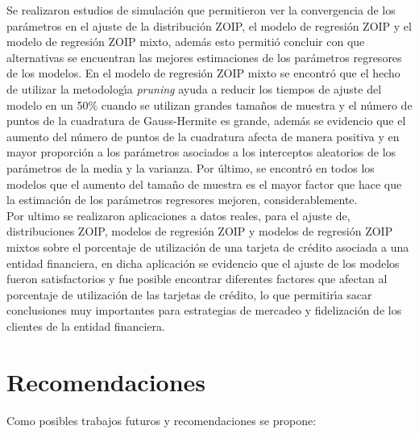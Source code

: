 Se realizaron estudios de simulaci\'{o}n que permitieron ver la convergencia de los par\'{a}metros en el ajuste de la distribuci\'{o}n ZOIP, el modelo de regresi\'{o}n ZOIP y el modelo de regresi\'{o}n ZOIP mixto, adem\'{a}s esto permiti\'{o} concluir con que alternativas se encuentran las mejores estimaciones de los par\'{a}metros regresores de los modelos. En el modelo de regresi\'{o}n ZOIP mixto se encontr\'{o} que el hecho de utilizar la metodolog\'{\i}a \textit{pruning} ayuda a reducir los tiempos de ajuste del modelo en un 50\% cuando se utilizan grandes tama\~{n}os de muestra y el n\'{u}mero de puntos de la cuadratura de Gauss-Hermite es grande, adem\'{a}s se evidencio que el aumento del n\'{u}mero de puntos de la cuadratura afecta de manera positiva y en mayor proporci\'{o}n a los par\'{a}metros asociados a los interceptos aleatorios de los par\'{a}metros de la media y la varianza. Por \'{u}ltimo, se encontr\'{o} en todos los modelos que el aumento del tama\~{n}o de muestra es el mayor factor que hace que la estimaci\'{o}n de los par\'{a}metros regresores mejoren, considerablemente.\\

Por ultimo se realizaron aplicaciones a datos reales, para el ajuste de, distribuciones ZOIP, modelos de regresi\'{o}n ZOIP y modelos de regresi\'{o}n ZOIP mixtos sobre el porcentaje de utilizaci\'{o}n de una tarjeta de cr\'{e}dito asociada a una entidad financiera, en dicha aplicaci\'{o}n se evidencio que el ajuste de los modelos fueron satisfactorios y  fue posible encontrar diferentes factores que afectan al porcentaje de utilizaci\'{o}n de las tarjetas de cr\'{e}dito, lo que permitir\'{\i}a sacar conclusiones muy importantes para estrategias de mercadeo y fidelizaci\'{o}n de los clientes de la entidad financiera.


\section{Recomendaciones}

Como posibles trabajos futuros y recomendaciones se propone:

